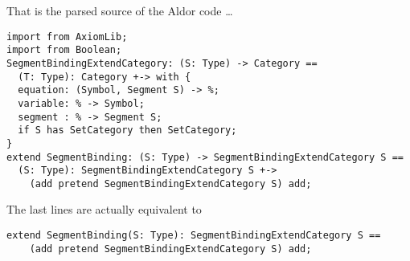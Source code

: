 \documentclass{article}
\begin{document}
That is the parsed source of the Aldor code \ldots
\begin{verbatim}
import from AxiomLib;
import from Boolean;
SegmentBindingExtendCategory: (S: Type) -> Category ==
  (T: Type): Category +-> with {
  equation: (Symbol, Segment S) -> %;
  variable: % -> Symbol;
  segment : % -> Segment S;
  if S has SetCategory then SetCategory;
}
extend SegmentBinding: (S: Type) -> SegmentBindingExtendCategory S ==
  (S: Type): SegmentBindingExtendCategory S +->
    (add pretend SegmentBindingExtendCategory S) add;
\end{verbatim}
The last lines are actually equivalent to
\begin{verbatim}
extend SegmentBinding(S: Type): SegmentBindingExtendCategory S ==
    (add pretend SegmentBindingExtendCategory S) add;
\end{verbatim}
\end{document}
